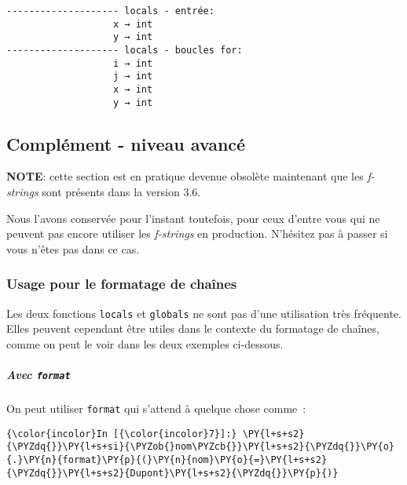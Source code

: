     \begin{Verbatim}[commandchars=\\\{\}]
-------------------- locals - entrée:
                   x → int
                   y → int
-------------------- locals - boucles for:
                   i → int
                   j → int
                   x → int
                   y → int

    \end{Verbatim}

    \hypertarget{compluxe9ment---niveau-avancuxe9}{%
\subsection{Complément - niveau
avancé}\label{compluxe9ment---niveau-avancuxe9}}

    \textbf{NOTE}: cette section est en pratique devenue obsolète maintenant
que les \emph{f-strings} sont présents dans la version 3.6.

Nous l'avons conservée pour l'instant toutefois, pour ceux d'entre vous
qui ne peuvent pas encore utiliser les \emph{f-strings} en production.
N'hésitez pas à passer si vous n'êtes pas dans ce cas.

    \hypertarget{usage-pour-le-formatage-de-chauxeenes}{%
\subsubsection{Usage pour le formatage de
chaînes}\label{usage-pour-le-formatage-de-chauxeenes}}

    Les deux fonctions \texttt{locals} et \texttt{globals} ne sont pas d'une
utilisation très fréquente. Elles peuvent cependant être utiles dans le
contexte du formatage de chaînes, comme on peut le voir dans les deux
exemples ci-dessous.

    \hypertarget{avec-format}{%
\subparagraph{\texorpdfstring{Avec
\texttt{format}}{Avec format}}\label{avec-format}}

    On peut utiliser \texttt{format} qui s'attend à quelque chose comme~:

    \begin{Verbatim}[commandchars=\\\{\}]
{\color{incolor}In [{\color{incolor}7}]:} \PY{l+s+s2}{\PYZdq{}}\PY{l+s+si}{\PYZob{}nom\PYZcb{}}\PY{l+s+s2}{\PYZdq{}}\PY{o}{.}\PY{n}{format}\PY{p}{(}\PY{n}{nom}\PY{o}{=}\PY{l+s+s2}{\PYZdq{}}\PY{l+s+s2}{Dupont}\PY{l+s+s2}{\PYZdq{}}\PY{p}{)}
\end{Verbatim}



